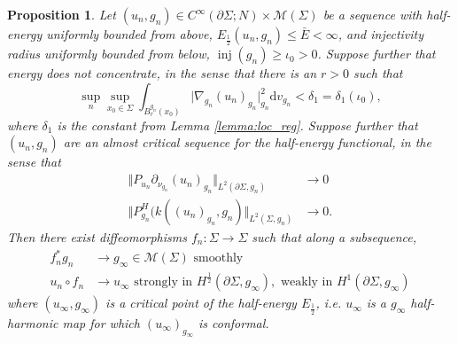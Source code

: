 \documentclass[10pt,reqno]{amsart}
\theoremstyle{plain}
\newtheorem{prop}[lemma]{Proposition}
\theoremstyle{definition}
\numberwithin{equation}{section}
\newcommand{\de}{\delta}
\newcommand{\Si}{\Sigma}
\DeclareMathOperator{\inj}{inj}
\newcommand{\norm}[1]{\Vert#1\Vert}
\newcommand{\dd}{\mathrm{d}} %
\newcommand{\abs}[1]{\vert#1\vert}
\newcommand{\MM}{\mathcal{M}} %
\newcommand{\hf}{\frac{1}{2}} %
\newcommand{\p}{\partial} %
\begin{document}
\begin{prop}\label{prop:sequence_converge}
	Let $(u_n,g_n) \in C^\infty(\p\Si;N)\times \MM(\Si)$ be a sequence with half-energy uniformly bounded from above, $E_\hf(u_n,g_n) \leq \bar{E} < \infty$, and injectivity radius uniformly bounded from below, $\inj(g_n) \geq \iota_0 > 0$. Suppose further that energy does not concentrate, in the sense that there is an $r>0$ such that
	\begin{equation}\label{est:asm_energy_bound}
		\sup\limits_{n}\sup\limits_{x_0 \in \Si}\int_{B_r^{g_n}(x_0)}\abs{\nabla_{g_n} (u_n)_{g_n}}_{g_n}^2 \dd v_{g_n} < \de_1 = \de_1(\iota_0),
	\end{equation}
    where $\de_1$ is the constant from Lemma \ref{lemma:loc_reg}. Suppose further that $(u_n,g_n)$ are an almost critical sequence for the half-energy functional, in the sense that
	\begin{align}
		\norm{P_{u_n}\p_{\nu_{g_n}} (u_n)_{g_n}}_{L^2(\p\Si,g_n)} &\rightarrow 0\label{est:map_almost_crit}\\
		\norm{P_{g_n}^{H}(k((u_n)_{g_n},g_n)}_{L^2(\Si,g_n)} &\rightarrow 0\label{est:metric_almost_crit}.
	\end{align}
	Then there exist diffeomorphisms $f_n:\Si \rightarrow \Si$ such that along a subsequence,
	\begin{align}
		f_n^* g_n &\rightarrow g_\infty\in \MM(\Si)\label{est:asm_metric_conv} \text{ smoothly}\\
		u_n \circ f_n &\rightarrow u_\infty\label{est:asm_map_conv} \text{ strongly in } H^\hf(\p\Si,g_\infty), \text{ weakly in } H^1(\p\Si,g_\infty)
	\end{align}
	where $(u_\infty,g_\infty)$ is a critical point of the half-energy $E_\hf$, i.e.  $u_\infty$ is a $g_\infty$ half-harmonic map for which $(u_\infty)_{g_\infty}$ is conformal.
\end{prop}
\end{document}
